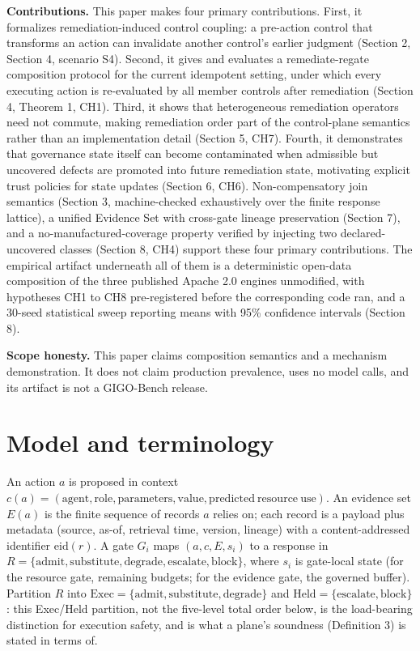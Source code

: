 \documentclass[11pt,a4paper]{article}
\theoremstyle{definition}
\begin{document}
\noindent\textbf{Contributions.} This paper makes four primary contributions. First, it formalizes remediation-induced control coupling: a pre-action control that transforms an action can invalidate another control's earlier judgment (Section 2, Section 4, scenario S4). Second, it gives and evaluates a remediate-regate composition protocol for the current idempotent setting, under which every executing action is re-evaluated by all member controls after remediation (Section 4, Theorem 1, CH1). Third, it shows that heterogeneous remediation operators need not commute, making remediation order part of the control-plane semantics rather than an implementation detail (Section 5, CH7). Fourth, it demonstrates that governance state itself can become contaminated when admissible but uncovered defects are promoted into future remediation state, motivating explicit trust policies for state updates (Section 6, CH6). Non-compensatory join semantics (Section 3, machine-checked exhaustively over the finite response lattice), a unified Evidence Set with cross-gate lineage preservation (Section 7), and a no-manufactured-coverage property verified by injecting two declared-uncovered classes (Section 8, CH4) support these four primary contributions. The empirical artifact underneath all of them is a deterministic open-data composition of the three published Apache 2.0 engines unmodified, with hypotheses CH1 to CH8 pre-registered before the corresponding code ran, and a 30-seed statistical sweep reporting means with 95\% confidence intervals (Section 8).

\noindent\textbf{Scope honesty.} This paper claims composition semantics and a mechanism demonstration. It does not claim production prevalence, uses no model calls, and its artifact is not a GIGO-Bench release.

\section{Model and terminology}

An action $a$ is proposed in context $c(a) = (\mathrm{agent}, \mathrm{role}, \mathrm{parameters}, \mathrm{value}, \mathrm{predicted\ resource\ use})$. An evidence set $E(a)$ is the finite sequence of records $a$ relies on; each record is a payload plus metadata (source, as-of, retrieval time, version, lineage) with a content-addressed identifier $\mathrm{eid}(r)$. A gate $G_i$ maps $(a, c, E, s_i)$ to a response in $R = \{\mathrm{admit}, \mathrm{substitute}, \mathrm{degrade}, \mathrm{escalate}, \mathrm{block}\}$, where $s_i$ is gate-local state (for the resource gate, remaining budgets; for the evidence gate, the governed buffer). Partition $R$ into $\mathrm{Exec} = \{\mathrm{admit}, \mathrm{substitute}, \mathrm{degrade}\}$ and $\mathrm{Held} = \{\mathrm{escalate}, \mathrm{block}\}$: this Exec/Held partition, not the five-level total order below, is the load-bearing distinction for execution safety, and is what a plane's soundness (Definition 3) is stated in terms of.
\end{document}
